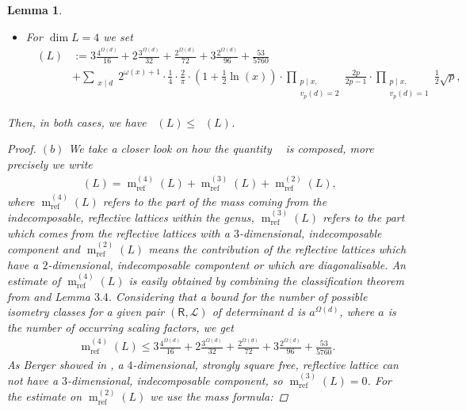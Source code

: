 \documentclass{amsart}
\newtheorem{lem}[thm]{Lemma}
\theoremstyle{definition}
\theoremstyle{remark}
\def\CL{{\mathcal L}}
\newcommand{\sR}{\mathsf R}
\DeclareMathOperator{\m}{m}
\DeclareMathOperator{\mref}{m_{ref}}
\DeclareMathOperator{\Mref}{M_{ref}}
\begin{document}
\begin{lem}
\begin{itemize}
  \item[b)] For $\dim L = 4$ we set
    \begin{align*}
     \Mref(L) &:=3\frac{4^{\Omega(d)}}{16} + 2\frac{3^{\Omega(d)}}{32} + \frac{2^{\Omega(d)}}{72} + 3\frac{2^{\Omega(d)}}{96} + \frac{53}{5760} \\
                         &+ \sum_{\substack{x \mid d}} 2^{\omega(x)+1} \cdot \frac{1}{4} \cdot \frac{2}{\pi} 
                         \cdot  \left(1+\frac{1}{2}\ln(x)\right)
                         \cdot \prod_{\substack{p \mid x,\\v_p(d)=2}}\frac{2p}{2p-1} \cdot \prod_{\substack{p \mid x,\\v_p(d)=1}}\frac{1}{2}\sqrt{p},                     
    \end{align*}
 \end{itemize}
 Then, in both cases, we have $\mref(L) \leq \Mref(L)$.
 \begin{proof}
  $(b)$ We take a closer look on how the quantity $\mref$ is composed, more precisely we write
   \begin{align*}
    \mref(L) = \m^{(4)}_{\mathrm{ref}}(L) + \m^{(3)}_{\mathrm{ref}}(L) + \m^{(2)}_{\mathrm{ref}}(L),
   \end{align*}
   where $\m^{(4)}_{\mathrm{ref}}(L)$ refers to the part of the mass coming from the indecomposable, reflective lattices within the genus,
   $\m^{(3)}_{\mathrm{ref}}(L)$ refers to the part which comes from the reflective lattices with a $3$-dimensional, indecomposable component and
   $\m^{(2)}_{\mathrm{ref}}(L)$ means the contribution of the reflective lattices which have a $2$-dimensional, indecomposable compontent or which are diagonalisable.
   An estimate of $\m^{(4)}_{\mathrm{ref}}(L)$ is easily obtained by combining the classification theorem from \cite{bs96} and Lemma $3.4$.
   Considering that a bound for the number of possible isometry classes 
   for a given pair $(\sR,\CL)$ of determinant $d$ is $a^{\Omega(d)}$, where $a$ is the number of occurring scaling factors, we get
   \begin{align*}
     \m^{(4)}_{\mathrm{ref}}(L) \leq 3\frac{4^{\Omega(d)}}{16} + 2\frac{3^{\Omega(d)}}{32} + \frac{2^{\Omega(d)}}{72} + 3\frac{2^{\Omega(d)}}{96} + \frac{53}{5760}.
   \end{align*}
   As Berger showed in \cite{ber93}, a $4$-dimensional, strongly square free, reflective lattice can not have a $3$-dimensional, indecomposable component, so $\m^{(3)}_{\mathrm{ref}}(L) = 0$.
   For the estimate on $\m^{(2)}_{\mathrm{ref}}(L)$ we use the mass formula:

\end{proof}
\end{lem}
\end{document}
